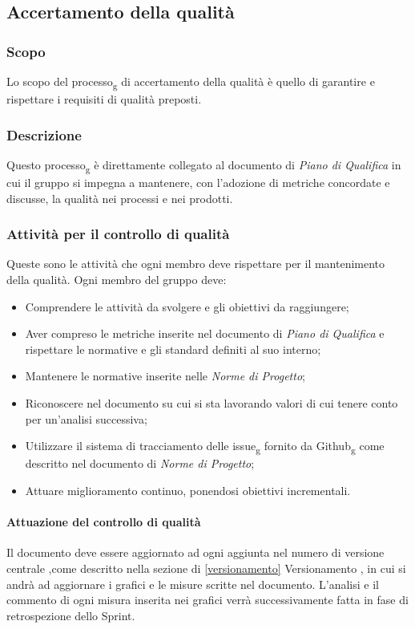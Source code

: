 \subsection{Accertamento della qualità}

\subsubsection{Scopo}
Lo scopo del processo\textsubscript{g} di accertamento della qualità è quello di garantire e rispettare i requisiti di qualità preposti.
\subsubsection{Descrizione}
Questo processo\textsubscript{g} è direttamente collegato al documento di \textit{Piano di Qualifica} in cui il gruppo si impegna a mantenere, con l'adozione di metriche concordate e discusse, la qualità nei processi e nei prodotti.
\subsubsection{Attività per il controllo di qualità}
Queste sono le attività che ogni membro deve rispettare per il mantenimento della qualità.
Ogni membro del gruppo deve:
\begin{itemize}
\item Comprendere le attività da svolgere e gli obiettivi da raggiungere;
\item Aver compreso le metriche inserite nel documento di \textit{Piano di Qualifica} e rispettare le normative e gli standard definiti al suo interno;
\item Mantenere le normative inserite nelle \textit{Norme di Progetto};
\item Riconoscere nel documento su cui si sta lavorando valori di cui tenere conto per un'analisi successiva;
\item Utilizzare il sistema di tracciamento delle issue\textsubscript{g} fornito da Github\textsubscript{g} come descritto nel documento di \textit{Norme di Progetto};
\item Attuare miglioramento continuo, ponendosi obiettivi incrementali.
\end{itemize}
\paragraph{Attuazione del controllo di qualità}
Il documento deve essere aggiornato ad ogni aggiunta nel numero di versione centrale ,come descritto nella sezione di \ref{versionamento} Versionamento , in cui si andrà ad aggiornare i grafici e le misure scritte nel documento. L’analisi e il commento di ogni misura inserita nei grafici verrà successivamente fatta in fase di retrospezione dello Sprint.
